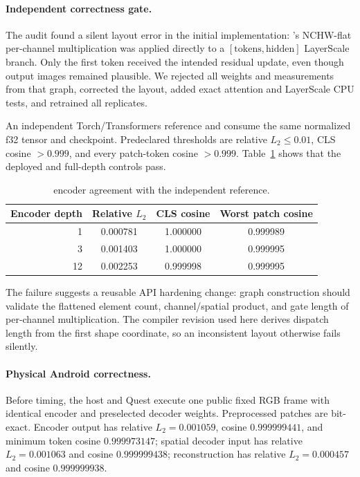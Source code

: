 \paragraph{Independent correctness gate.}
The audit found a silent layout error in the initial implementation:
\system{}'s NCHW-flat per-channel multiplication was applied directly to a
$[\mathrm{tokens},\mathrm{hidden}]$ LayerScale branch. Only the first token
received the intended residual update, even though output images remained
plausible. We rejected all weights and measurements from that graph, corrected
the layout, added exact attention and LayerScale CPU tests, and retrained all
replicates.

An independent Torch/Transformers reference and \system{} consume the same
normalized f32 tensor and checkpoint. Predeclared thresholds are relative
$L_2\leq0.01$, CLS cosine $>0.999$, and every patch-token cosine $>0.999$.
Table~\ref{tab:dinovision-correctness} shows that the deployed and full-depth
controls pass.

\begin{table}[t]
  \centering
  \footnotesize
  \setlength{\tabcolsep}{4pt}
  \caption{\system{} encoder agreement with the independent reference.}
  \label{tab:dinovision-correctness}
  \begin{tabular}{rccc}
    \toprule
    Encoder depth & Relative $L_2$ & CLS cosine & Worst patch cosine \\
    \midrule
     1 & 0.000781 & 1.000000 & 0.999989 \\
     3 & 0.001403 & 1.000000 & 0.999995 \\
    12 & 0.002253 & 0.999998 & 0.999995 \\
    \bottomrule
  \end{tabular}
\end{table}

The failure suggests a reusable API hardening change: graph construction
should validate the flattened element count, channel/spatial product, and gate
length of per-channel multiplication. The compiler revision used here derives
dispatch length from the first shape coordinate, so an inconsistent layout
otherwise fails silently.

\paragraph{Physical Android correctness.}
Before timing, the host and Quest execute one public fixed RGB frame with
identical encoder and preselected decoder weights. Preprocessed patches are
bit-exact. Encoder output has relative $L_2=0.001059$, cosine $0.999999441$,
and minimum token cosine $0.999973147$; spatial decoder input has relative
$L_2=0.001063$ and cosine $0.999999438$; reconstruction has relative
$L_2=0.000457$ and cosine $0.999999938$.

